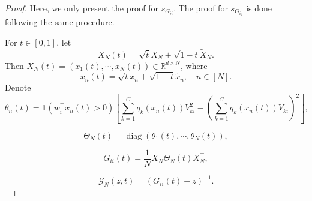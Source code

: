 \documentclass{article}
\newcommand\mf{\mathbf}
\newcommand\ml{\mathcal}
\newcommand{\wt}{\widetilde}
\newcommand{\1}{^{(1)}}
\newcommand{\2}{^{(2)}}
\renewcommand{\l}{\left}
\renewcommand{\r}{\right}
\begin{document}
\begin{proof}
    Here, we only present the proof for $s_{G_{ii}}$. The proof for $s_{G_{ij}}$ is done following the same procedure. 
    
    For $t\in [0,1]$, let 
    $$
    X_N(t)=\sqrt{t}X_N+\sqrt{1-t}\wt{X}_N.
    $$
    Then $X_N(t)=(x_1(t),\cdots,x_N(t)) \in \mathbb{R}^{d\times N}$, where
    $$
    x_n(t)=\sqrt{t}x_n+\sqrt{1-t}\wt{x}_n,\quad n\in [N].
    $$
        Denote
    $$
    {\theta}_n(t)=\mf{1}(w_i^\top x_n(t)>0)\l[\sum_{k=1}^C q_k(x_n(t))V_{ki}^2-\l(\sum_{k=1}^Cq_k(x_n(t))V_{ki}\r)^2\r],
    $$


    $$
    \Theta_N(t)=\operatorname{diag}(\theta_1(t),\cdots,\theta_N(t)),
    $$
    
    
    $$
    G_{ii}(t)=\frac{1}{N}X_N\Theta_N(t)X_N^\top,
    $$
    
    $$
    \ml{G}_N(z,t)=(G_{ii}(t)-z)^{-1}.
    $$
    

\end{proof}
\end{document}
